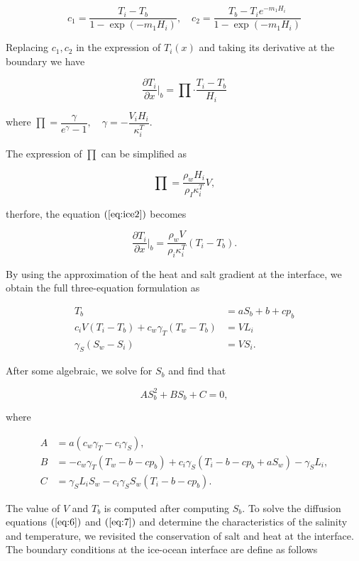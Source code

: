 \documentclass[11pt,a4paper]{article}
\begin{document}
		$$c_1 = \dfrac{T_i-T_b}{1-\exp(-m_1H_i)}, \quad c_2 = \dfrac{T_b-T_ie^{-m_1H_i}}{1-\exp(-m_1H_i)}$$
		
		Replacing $c_1, c_2$ in the expression of $T_i(x)$ and taking its derivative at the boundary we have
		
		\begin{equation}
			\label{eq:ice2}
			\dfrac{\partial T_i}{\partial x}\bigg|_b = \prod\cdot \dfrac{T_i-T_b}{H_i}
		\end{equation}
		
		where $\prod = \dfrac{\gamma}{e^{\gamma}-1}, \quad \gamma = -\dfrac{V_iH_i}{\kappa_i^T}.$
		
		The expression of $\prod$ can be simplified as 
		
		$$\prod = \dfrac{\rho_wH_i}{\rho_I\kappa_i^T}V,$$
		
		therfore, the equation $(\ref{eq:ice2})$ becomes
		
		\begin{equation}
			\label{eq:16}
			\dfrac{\partial T_i}{\partial x}\bigg|_b = \dfrac{\rho_wV}{\rho_i\kappa_i^T}\left( T_i-T_b\right).
		\end{equation}
	
		By using the approximation of the heat and salt gradient at the interface, we obtain the full three-equation formulation as
		
		\begin{align}
			T_b & = a S_b + b + cp_b\\
			c_iV\left(T_i-T_b\right) + c_w\gamma_T(T_w-T_b)& = VL_i\\
			\gamma_S(S_w-S_i) & = VS_i.
		\end{align}
	
		After some algebraic, we solve for $S_b$ and find that
		
		\begin{equation}
			AS_b^2 + BS_b + C = 0,
		\end{equation}
		
		where
		
	\begin{align*}
		A &= a(c_w\gamma_T-c_i\gamma_S),\\
		B &= -c_w\gamma_T(T_w-b-cp_b) + c_i\gamma_S(T_i-b-cp_b+aS_w)-\gamma_SL_i,\\
		C &= \gamma_SL_iS_w-c_i\gamma_SS_w(T_i-b-cp_b).
	\end{align*}
		
	The value of $V$ and $T_b$ is computed after computing $S_b$. To solve the diffusion equations $(\ref{eq:6})$ and $(\ref{eq:7})$ and determine the characteristics of the salinity and temperature, we revisited the conservation of salt and heat at the interface. The boundary conditions at the ice-ocean interface are define as follows 
	
\end{document}
